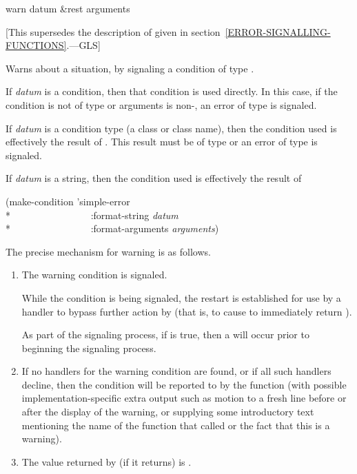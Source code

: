 \begin{defun}[Function]
warn datum &rest arguments

   [This supersedes the description of 
   given in section~\ref{ERROR-SIGNALLING-FUNCTIONS}.---GLS]

  Warns about a situation, by signaling a condition of type .

  If \emph{datum} is a condition, then that condition is used directly.
  In this case, if the condition is not of type  or arguments
  is non-, an error of type  is signaled.

  If \emph{datum} is a condition type (a class or class name), then the condition used is effectively the result
  of . This result
  must be of type  or an error of type  is signaled.

  If \emph{datum} is a string, then the condition used is effectively the result of
\begin{lisp}
(make-condition 'simple-error \\*
~~~~~~~~~~~~~~~~:format-string \emph{datum} \\*
~~~~~~~~~~~~~~~~:format-arguments \emph{arguments})
\end{lisp}

  The precise mechanism for warning is as follows.
\begin{enumerate}

\item The warning condition is signaled.

     While the  condition is being signaled, the 
     restart is established for use by a handler to bypass further action
     by  (that is, to cause  to immediately return ).

     As part of the signaling process, if
     is true, then a  will occur prior to beginning the signaling
     process.

\item If no handlers for the warning condition are found, or if all such
     handlers decline, then the condition will be reported to 
     by the  function (with possible implementation-specific extra
     output such as motion to a fresh line before or after the display
     of the warning, or supplying some introductory text mentioning
     the name of the function that called  or the fact that this
     is a warning).

\item The value returned by  (if it returns) is .
\end{enumerate}
\end{defun}

